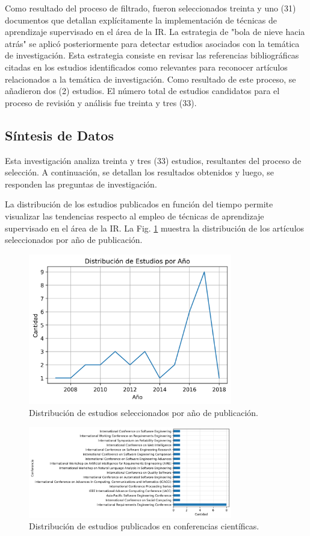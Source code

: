 \documentclass[journal]{IEEEtran}
\begin{document}
Como resultado del proceso de filtrado, fueron seleccionados treinta y uno (31) documentos que detallan explícitamente la implementación de técnicas de aprendizaje supervisado en el área de la IR. La estrategia de "bola de nieve hacia atrás" \cite{wohlin2014guidelines} se aplicó posteriormente para detectar estudios asociados con la temática de investigación. Esta estrategia consiste en revisar las referencias bibliográficas citadas en los estudios identificados como relevantes para reconocer artículos relacionados a la temática de investigación. Como resultado de este proceso, se añadieron dos (2) estudios. El número total de estudios candidatos para el proceso de revisión y análisis fue treinta y tres (33).

\subsection{Síntesis de Datos }

Esta investigación analiza treinta y tres (33) estudios, resultantes del proceso de selección. A continuación, se detallan los resultados obtenidos y luego, se responden las preguntas de investigación.

La distribución de los estudios publicados en función del tiempo permite visualizar las tendencias respecto al empleo de técnicas de aprendizaje supervisado en el área de la IR. La Fig. \ref{fig:5} muestra la distribución de los artículos seleccionados por año de publicación.

\begin{figure}[!t]
\centering
\includegraphics[width=3.5in]{figures/Figure5_Guada.png}
\caption{Distribuci\'on de estudios seleccionados por año de publicaci\'on.}
\label{fig:5}
\end{figure}


\begin{figure}[!t]
\centering
\includegraphics[width=3.5in]{figures/Figure6_Guada.png}
\caption{Distribuci\'on de estudios publicados en conferencias cient\'ificas.}
\label{fig:6}
\end{figure}
\end{document}
